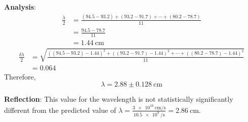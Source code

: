\documentclass{article}
\begin{document}
\textbf{Analysis}:\\
\begin{align*}
    \frac{\lambda}{2} &= \frac{(94.5-93.2)+(93.2-91.7)+\cdots+(80.2-78.7)}{11}\\
    &= \frac{94.5-78.7}{11}\\
    &= \SI{1.44}{\centi\meter}
\end{align*}
\begin{align*}
    \frac{\delta\lambda}{2} &= \sqrt{\frac{((94.5-93.2)-1.44)^2+((93.2-91.7)-1.44)^2+\cdots+((80.2-78.7)-1.44)^2}{11}}\\
    &= 0.064
\end{align*}
Therefore,
\begin{equation*}
    \lambda = 2.88\pm\SI{0.128}{\centi\meter}
\end{equation*}\par
\textbf{Reflection}: This value for the wavelength is not statistically significantly different from the predicted value of $\lambda=\frac{\SI{3e10}{\centi\meter\per\second}}{\SI{10.5e9}{\per\second}}=\SI{2.86}{\centi\meter}$.
\end{document}
